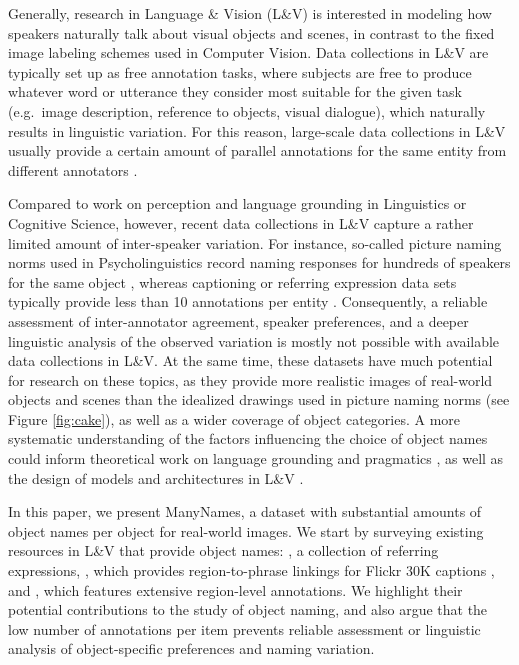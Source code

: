 Generally, research in Language \& Vision (L\&V) is interested in modeling how speakers naturally talk about visual objects and scenes, in contrast to the fixed image labeling schemes used in Computer Vision.
Data collections in L\&V are typically set up as free annotation tasks,  where subjects are free to produce whatever word or utterance they consider most suitable for the given task (e.g.\ image description, reference to objects, visual dialogue), which naturally results in linguistic variation.
For this reason, large-scale data collections in L\&V usually provide a certain amount of parallel annotations for the same entity from different annotators \cite{fangetal:2015,devlin:imcaqui,Kazemzadeh2014,mao15,vries2017guesswhat}.

Compared to work on perception and language grounding in Linguistics or Cognitive Science, however, recent data collections in L\&V capture a rather limited amount of inter-speaker variation.
For instance, so-called picture naming norms used in Psycholinguistics record naming responses for hundreds of speakers for the same object  \cite{snodgrass,rossion2004revisiting}, whereas captioning or referring expression data sets typically provide less than 10 annotations per entity \cite{devlin:imcaqui,Kazemzadeh2014,mao15}.
Consequently, a reliable assessment of inter-annotator agreement, speaker preferences, and a deeper linguistic analysis of the observed variation is mostly not possible with available data collections in  L\&V.
At the same time, these datasets have much potential for research on these topics, as they provide more realistic images of real-world objects and scenes than the idealized drawings used in picture naming norms (see Figure \ref{fig:cake}), as well as a wider coverage of object categories.
A more systematic understanding of the factors influencing the choice of object names could inform theoretical work on language grounding and pragmatics \cite{rohde2012communicating,graf2016animal}, as well as the design of models and architectures in L\&V \cite{lazaridou-dinu-baroni:2015:ACL-IJCNLP,Ordonez:2016,zhao2017open}.

In this paper, we present ManyNames, a dataset with substantial amounts of object names per object for real-world images.
We start by surveying existing resources in L\&V that provide object names:  \cite{Yu2016}, a collection of referring expressions, \flickr \cite{plummer2015flickr30kentities}, which provides region-to-phrase linkings for Flickr 30K captions \cite{young:2014}, and \vgenome \cite{krishna2016visualgenome}, which features extensive region-level annotations. We highlight their potential contributions to the study of object naming, and also argue that the low number of annotations per item prevents reliable assessment or linguistic analysis of object-specific preferences and naming variation.

